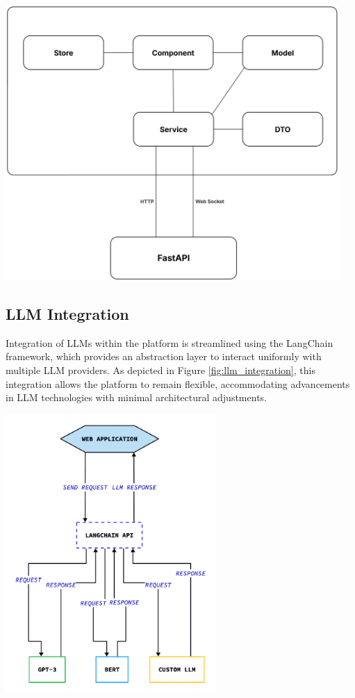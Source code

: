 \begin{center}
    \includegraphics[width=0.95\textwidth]{Images/Component Architecture of a Frontend Module.png}
    \label{fig:frontend_module_architecture}
\end{center}

\subsection{LLM Integration}
Integration of LLMs within the platform is streamlined using the LangChain framework, which provides an abstraction layer to interact uniformly with multiple LLM providers. As depicted in Figure \ref{fig:llm_integration}, this integration allows the platform to remain flexible, accommodating advancements in LLM technologies with minimal architectural adjustments.\mynewline

\begin{center}
    \centering
    \includegraphics[width=0.6\textwidth]{Images/LLM Integration.png}
    \label{fig:llm_integration}
\end{center}

